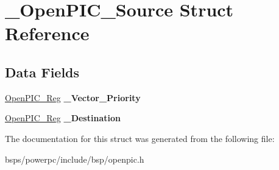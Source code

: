\hypertarget{struct__OpenPIC__Source}{}\section{\+\_\+\+Open\+P\+I\+C\+\_\+\+Source Struct Reference}
\label{struct__OpenPIC__Source}
\subsection*{Data Fields}
\begin{DoxyCompactItemize}
\item 
\mbox{\label{struct__OpenPIC__Source_abc4068c5121b2e8ce3cf059c37aa857b}} 
\mbox{\hyperlink{struct__OpenPIC__Reg}{Open\+P\+I\+C\+\_\+\+Reg}} {\bfseries \+\_\+\+Vector\+\_\+\+Priority}
\item 
\mbox{\label{struct__OpenPIC__Source_a0a16c72b0b03ff3d453cdccae0ae4d3a}} 
\mbox{\hyperlink{struct__OpenPIC__Reg}{Open\+P\+I\+C\+\_\+\+Reg}} {\bfseries \+\_\+\+Destination}
\end{DoxyCompactItemize}


The documentation for this struct was generated from the following file\+:\begin{DoxyCompactItemize}
\item 
bsps/powerpc/include/bsp/openpic.\+h\end{DoxyCompactItemize}
